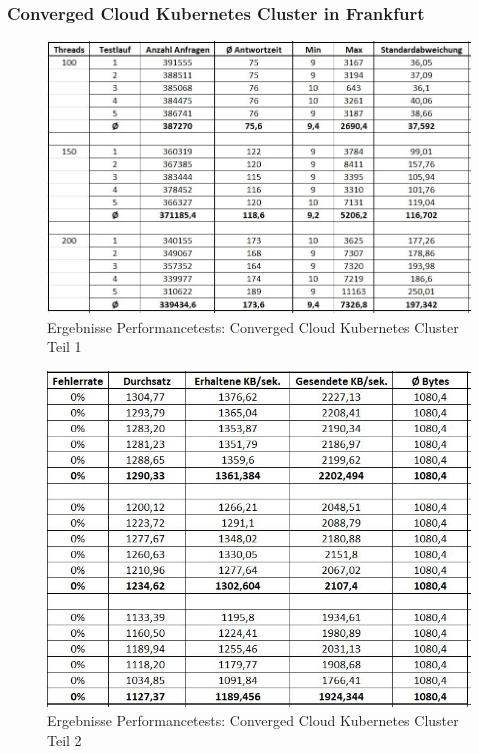\subsubsection{Converged Cloud Kubernetes Cluster in Frankfurt}
\label{section_performance_k8s_con_cloud}
\begin{figure}[h]
	\begin{center}
		\includegraphics[width=16cm]{img/performance_con_cloud_1.JPG}
		\caption[Performancetests: Converged Cloud Kubernetes Cluster Teil 1]{Ergebnisse Performancetests: Converged Cloud Kubernetes Cluster Teil 1}
		\label{performance_con_cloud_1}
	\end{center}
\end{figure}
\newpage
\begin{figure}[h]
	\begin{center}
		\includegraphics[width=16cm]{img/performance_con_cloud_2.JPG}
		\caption[Performancetests: Converged Cloud Kubernetes Cluster Teil 2]{Ergebnisse Performancetests: Converged Cloud Kubernetes Cluster Teil 2}
		\label{performance_con_cloud_2}
	\end{center}
\end{figure}

